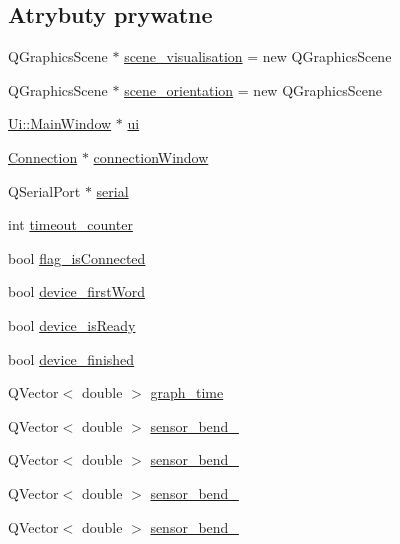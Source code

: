 \subsection*{Atrybuty prywatne}
\begin{DoxyCompactItemize}
\item 
Q\+Graphics\+Scene $\ast$ \hyperlink{class_main_window_a9f7060038c5585a483d5b4f0b5f59a7c}{scene\+\_\+visualisation} = new Q\+Graphics\+Scene
\item 
Q\+Graphics\+Scene $\ast$ \hyperlink{class_main_window_ae0596a9c14d7ce17955bdc53aae33b96}{scene\+\_\+orientation} = new Q\+Graphics\+Scene
\item 
\hyperlink{class_ui_1_1_main_window}{Ui\+::\+Main\+Window} $\ast$ \hyperlink{class_main_window_a35466a70ed47252a0191168126a352a5}{ui}
\item 
\hyperlink{class_connection}{Connection} $\ast$ \hyperlink{class_main_window_acdf7c3f40019c435964111615d084abd}{connection\+Window}
\item 
Q\+Serial\+Port $\ast$ \hyperlink{class_main_window_a9029411f21223671e111ff617fcece6a}{serial}
\item 
int \hyperlink{class_main_window_a93b6fc6e9f57184aaa853cf6106396be}{timeout\+\_\+counter}
\item 
bool \hyperlink{class_main_window_adaeb8abe2aaffe100eea01fea88401bc}{flag\+\_\+is\+Connected}
\item 
bool \hyperlink{class_main_window_af8520e13f6dc00d6171c19c995f31c37}{device\+\_\+first\+Word}
\item 
bool \hyperlink{class_main_window_abdbd21e2b6eb4addef5b97e7193c3c97}{device\+\_\+is\+Ready}
\item 
bool \hyperlink{class_main_window_ac2b317c4138542cc3505a8905ad196ff}{device\+\_\+finished}
\item 
Q\+Vector$<$ double $>$ \hyperlink{class_main_window_ae660597d87556a5044ec5b869761a22c}{graph\+\_\+time}
\item 
Q\+Vector$<$ double $>$ \hyperlink{class_main_window_ac69938fc088e26e13a40f09a18720e88}{sensor\+\_\+bend\+\_}
\item 
Q\+Vector$<$ double $>$ \hyperlink{class_main_window_a3b58d3852e1d110314c09afd2d4c29fc}{sensor\+\_\+bend\+\_}
\item 
Q\+Vector$<$ double $>$ \hyperlink{class_main_window_a562c97b5ed080b1ab7815fb48f99b720}{sensor\+\_\+bend\+\_}
\item 
Q\+Vector$<$ double $>$ \hyperlink{class_main_window_a2a37b15b3e71f8ac6cff2123b4fbf985}{sensor\+\_\+bend\+\_}

\end{DoxyCompactItemize}
